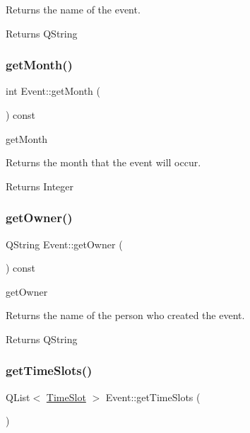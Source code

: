 Returns the name of the event. \begin{DoxyReturn}{Returns}
Q\+String 
\end{DoxyReturn}
\mbox{\label{class_event_a29caad464e4a7cf6aa29973ed9345f6d}} 
\subsubsection{\texorpdfstring{get\+Month()}{getMonth()}}
{\footnotesize\ttfamily int Event\+::get\+Month (\begin{DoxyParamCaption}{ }\end{DoxyParamCaption}) const}



get\+Month 

Returns the month that the event will occur. \begin{DoxyReturn}{Returns}
Integer 
\end{DoxyReturn}
\mbox{\label{class_event_ab7e1dc08bd691aaf95ad994afdea6d2b}} 
\subsubsection{\texorpdfstring{get\+Owner()}{getOwner()}}
{\footnotesize\ttfamily Q\+String Event\+::get\+Owner (\begin{DoxyParamCaption}{ }\end{DoxyParamCaption}) const}



get\+Owner 

Returns the name of the person who created the event. \begin{DoxyReturn}{Returns}
Q\+String 
\end{DoxyReturn}
\mbox{\label{class_event_a1d54b94176660fa89f06e47de4f38f91}} 
\subsubsection{\texorpdfstring{get\+Time\+Slots()}{getTimeSlots()}}
{\footnotesize\ttfamily Q\+List$<$ \hyperlink{class_time_slot}{Time\+Slot} $>$ Event\+::get\+Time\+Slots (\begin{DoxyParamCaption}{ }\end{DoxyParamCaption})}



